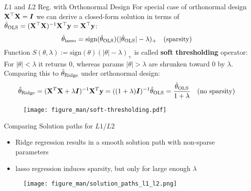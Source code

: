\documentclass[11pt,compress,t,notes=noshow, xcolor=table]{beamer}
\begin{document}
\begin{vbframe}{$L1$ and $L2$ Reg. with Orthonormal Design}
\small For special case of orthonormal design $\mathbf{X}^{\top}\mathbf{X}=\boldsymbol{I}$ we can derive a closed-form solution in terms of $\hat{\theta}_{\text{OLS}}=(\mathbf{X}^{\top}\mathbf{X})^{-1}\mathbf{X}^{\top}\mathbf{y}=\mathbf{X}^{\top}\mathbf{y}$:
\vspace{-0.1cm}
$$\thetah_{\text{lasso}}=\text{sign}(\thetah_{\text{OLS}})(\vert \thetah_{\text{OLS}} \vert - \lambda)_{+}\quad(\text{sparsity})\vspace{-0.1cm}$$
Function $S(\theta,\lambda):=\text{sign}(\theta)(|\theta|-\lambda)_{+}$ is called \textbf{soft thresholding} operator: For $|\theta|<\lambda$ it returns $0$, whereas params $|\theta|>\lambda$ are shrunken toward $0$ by $\lambda$.\\
Comparing this to $\hat{\theta}_{\text{Ridge}}$ under orthonormal design: %
\vspace{-0.3cm}
$$\thetah_{\text{Ridge}}= ({\Xmat}^T \Xmat  + \lambda \id)^{-1} \Xmat^T\yv=((1+\lambda)\id)^{-1}\thetah_{\text{OLS}} = \frac{\thetah_{\text{OLS}}}{1+\lambda}\quad (\text{no sparsity})\vspace{-0.22cm}$$
\vspace{-0.16cm}
\begin{figure}
\texttt{[image: figure\_man/soft-thresholding.pdf]}\\
\end{figure}

\end{vbframe}

\begin{vbframe}{Comparing Solution paths for $L1$/$L2$}
\begin{itemize}
    \item Ridge regression results in a smooth solution path with non-sparse parameters
    \item lasso regression induces sparsity, but only for large enough $\lambda$
\end{itemize}
 \lz
\begin{figure}
\texttt{[image: figure\_man/solution\_paths\_l1\_l2.png]}\\
\end{figure}

\end{vbframe}
\end{document}
